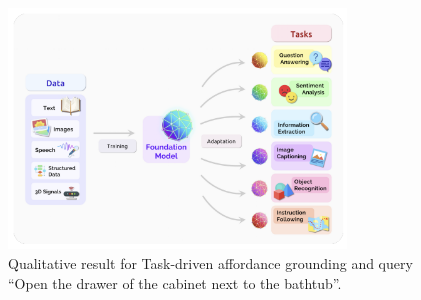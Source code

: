 \begin{figure}[ht!]
    \centering
    \includegraphics[width=0.8\textwidth]{images/FoundationModels.png}
    \caption{Qualitative result for Task-driven affordance grounding and query \enquote{Open the drawer of the cabinet next to the bathtub}.}
    \label{fig:task2result2}
\end{figure}